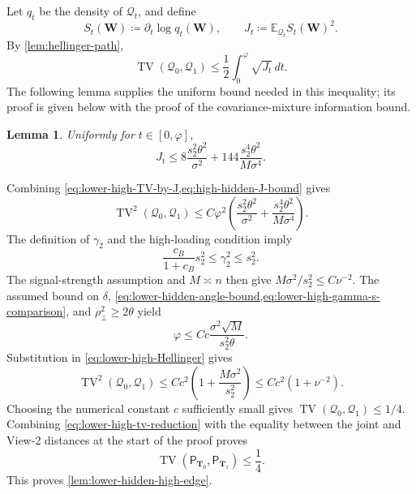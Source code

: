 \documentclass[11pt]{article}
\newtheorem{lemma}{Lemma}
\begin{document}
Let $q_t$ be the density of $\mathcal Q_t$, and define
\begin{equation}
  S_t(\bm W)\coloneqq\partial_t\log q_t(\bm W),
  \qquad
  J_t\coloneqq\mathbb E_{\mathcal Q_t}S_t(\bm W)^2.
\label{eq:lower-high-J-definition}
\end{equation}
By \cref{lem:hellinger-path},
\begin{equation}
  \operatorname{TV}(\mathcal Q_0,\mathcal Q_1)
  \le
  \frac12\int_0^\varphi\sqrt{J_t}\,dt.
\label{eq:lower-high-TV-by-J}
\end{equation}
The following lemma supplies the uniform bound needed in this inequality;
its proof is given below with the proof of the covariance-mixture information
bound.

\begin{lemma}
\label{lem:high-hidden-J-bound}
Uniformly for $t\in[0,\varphi]$,
\begin{equation}
  J_t
  \le
  8\frac{s_2^2\theta^2}{\sigma^2}
  +
  144\frac{s_2^4\theta^2}{M\sigma^4}.
\label{eq:high-hidden-J-bound}
\end{equation}
\end{lemma}

Combining \cref{eq:lower-high-TV-by-J,eq:high-hidden-J-bound} gives
\begin{equation}
  \operatorname{TV}^2(\mathcal Q_0,\mathcal Q_1)
  \le
  C\varphi^2
  \left(
    \frac{s_2^2\theta^2}{\sigma^2}
    +
    \frac{s_2^4\theta^2}{M\sigma^4}
  \right).
\label{eq:lower-high-Hellinger}
\end{equation}
The definition of $\gamma_2$ and the high-loading condition imply
\begin{equation}
  \frac{c_B}{1+c_B}s_2^2
  \le
  \gamma_2^2
  \le
  s_2^2.
\label{eq:lower-high-gamma-s-comparison}
\end{equation}
The signal-strength assumption and $M\asymp n$ then give
$M\sigma^2/s_2^2\le C\nu^{-2}$.  The assumed bound on $\delta$,
\cref{eq:lower-hidden-angle-bound,eq:lower-high-gamma-s-comparison}, and
$\rho_\perp^2\ge2\theta$ yield
\begin{equation}
  \varphi
  \le
  Cc\frac{\sigma^2\sqrt M}{s_2^2\theta}.
\label{eq:lower-high-angle-information}
\end{equation}
Substitution in \cref{eq:lower-high-Hellinger} gives
\begin{equation}
  \operatorname{TV}^2(\mathcal Q_0,\mathcal Q_1)
  \le
  Cc^2\left(1+\frac{M\sigma^2}{s_2^2}\right)
  \le
  Cc^2(1+\nu^{-2}).
\label{eq:lower-high-final-TV}
\end{equation}
Choosing the numerical constant $c$ sufficiently small gives
$\operatorname{TV}(\mathcal Q_0,\mathcal Q_1)\le1/4$.  Combining
\cref{eq:lower-high-tv-reduction} with the equality between the joint and
View-2 distances at the start of the proof proves
\[
  \operatorname{TV}(\mathsf P_{\bm T_0},\mathsf P_{\bm T_1})
  \le
  \frac14.
\]
This proves \cref{lem:lower-hidden-high-edge}.
\end{document}
